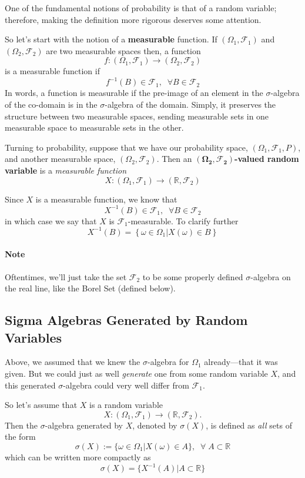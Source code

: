 \documentclass[a4paper,12pt]{scrartcl}
\begin{document}
One of the fundamental notions of probability is that of a random 
variable; therefore, making the definition more rigorous 
deserves some attention.

So let's start with the notion of a \textbf{measurable} function.  
If $(\Omega_1, \mathcal{F}_1)$ and $(\Omega_2, \mathcal{F}_2)$ are two 
measurable spaces then, a function 
   \[ f: (\Omega_1, \mathcal{F}_1) \rightarrow (\Omega_2, \mathcal{F}_2) 
      \]
is a measurable function if
   \[ f^{-1}(B) \in \mathcal{F}_1, \;\; \forall B \in\mathcal{F}_2 \]
In words, a function is measurable if the pre-image of an element in 
the $\sigma$-algebra of the co-domain is in the
$\sigma$-algebra of the domain.  Simply, it preserves the structure 
between two measurable spaces, sending measurable sets
in one measurable space to measurable sets in the other.

Turning to probability, suppose  that we have our probability space, 
$(\Omega_1, \mathcal{F}_1, P)$, and another measurable space, 
$(\Omega_2,\mathcal{F}_2)$.  Then an 
$\mathbf{(\Omega_2, \mathcal{F}_2)}$\textbf{-valued random variable} 
is a \emph{measurable function}
\[ X: (\Omega_1, \mathcal{F}_1) \rightarrow (\mathbb{R}, 
   \mathcal{F}_2) \]

Since $X$ is a measurable function, we know that
   \[ X^{-1}(B) \in \mathcal{F}_1, \;\; \forall B \in \mathcal{F}_2\]
in which case we say that $X$ is $\mathcal{F}_1$-measurable. 
To clarify further
   \[ X^{-1}(B) = \left\{ \omega \in \Omega_1 | X(\omega) 
      \in B \right\} \]

\paragraph{Note} Oftentimes, we'll just take the set 
$\mathcal{F}_2$ to be some properly 
defined $\sigma$-algebra on the real line, like the Borel Set 
(defined below).

\subsection{Sigma Algebras Generated by Random Variables}

Above, we assumed that we knew the $\sigma$-algebra for 
$\Omega_1$ already---that it was given. But we 
could just as well \emph{generate} one from some random variable $X$, 
and this generated $\sigma$-algebra could very well differ from 
$\mathcal{F}_1$.  

So let's assume that $X$ is a random variable 
   \[X: (\Omega_1,\mathcal{F}_1) \rightarrow 
      (\mathbb{R},\mathcal{F}_2).\]
Then the $\sigma$-algebra generated by $X$, denoted by $\sigma(X)$, is 
defined as \emph{all} sets of the form
   \[ \sigma(X) := \{ \omega \in \Omega_1 | X(\omega) \in A \}, \;\;  
      \forall \; A \subset \mathbb{R} \]
which can be written more compactly as
   \[\sigma(X)  = \{ X^{-1}(A) | A\subset \mathbb{R}  \} \]
\end{document}
